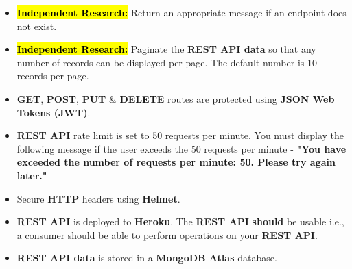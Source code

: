 \documentclass{article}
\begin{document}
\begin{itemize}
	\item \hl{\textbf{Independent Research:}} Return an appropriate message if an endpoint does not exist.
	\item \hl{\textbf{Independent Research:}} Paginate the \textbf{REST API data} so that any number of records can be displayed per page. The default number is 10 records per page. 
	\item \textbf{GET}, \textbf{POST}, \textbf{PUT} \& \textbf{DELETE} routes are protected using \textbf{JSON Web Tokens (JWT)}.
	\item \textbf{REST API} rate limit is set to 50 requests per minute. You must display the following message if the user exceeds the 50 requests per minute - \textbf{"You have exceeded the number of requests per minute: 50. Please try again later."}
	\item Secure \textbf{HTTP} headers using \textbf{Helmet}. 
	\item \textbf{REST API} is deployed to \textbf{Heroku}. The \textbf{REST API} \textbf{should} be usable i.e., a consumer should be able to perform operations on your \textbf{REST API}.
	\item \textbf{REST API data} is stored in a \textbf{MongoDB Atlas} database.
\end{itemize}
\end{document}
